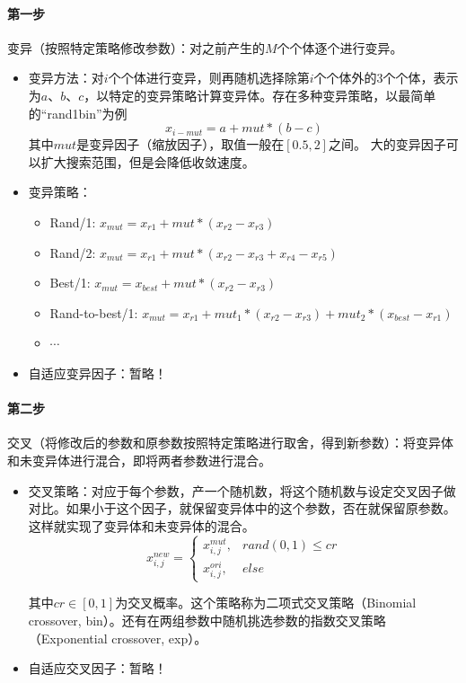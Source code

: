 \paragraph{第一步} 变异（按照特定策略修改参数）：对之前产生的$M$个个体逐个进行变异。
\begin{itemize}
\item 变异方法：对$i$个个体进行变异，则再随机选择除第$i$个个体外的3个个体，表示为$a$、$b$、$c$，以特定的变异策略计算变异体。存在多种变异策略，以最简单的“rand1bin”为例
\begin{equation}
x_{i-mut} = a + mut * (b-c)
\end{equation}
其中$mut$是变异因子（缩放因子），取值一般在$[0.5,2]$之间。 大的变异因子可以扩大搜索范围，但是会降低收敛速度。
\item 变异策略：
\begin{itemize}
\item Rand/1: $x_{mut} = x_{r1} + mut*(x_{r2}-x_{r3})$
\item Rand/2: $x_{mut} =x_{r1} + mut*(x_{r2}-x_{r3}+x_{r4}-x_{r5})$
\item Best/1: $x_{mut}=x_{best}+mut*(x_{r2}-x_{r3})$
\item Rand-to-best/1: $x_{mut}=x_{r1}+mut_1 *(x_{r2}-x_{r3}) + mut_2*(x_{best}-x_{r1})$
\item $\cdots$
\end{itemize}
\item 自适应变异因子：暂略！
\end{itemize}



\paragraph{第二步} 交叉（将修改后的参数和原参数按照特定策略进行取舍，得到新参数）：将变异体和未变异体进行混合，即将两者参数进行混合。
\begin{itemize}
\item 交叉策略：对应于每个参数，产一个随机数，将这个随机数与设定交叉因子做对比。如果小于这个因子，就保留变异体中的这个参数，否在就保留原参数。这样就实现了变异体和未变异体的混合。
\begin{equation}
x_{i,j}^{new} =\begin{cases}
x_{i,j}^{mut},& rand(0,1)\le cr\\
x_{i,j}^{ori}, &else
\end{cases}
\end{equation}

其中$cr \in [0,1]$为交叉概率。这个策略称为二项式交叉策略（Binomial crossover, bin）。还有在两组参数中随机挑选参数的指数交叉策略（Exponential crossover, exp）。

\item 自适应交叉因子：暂略！
\end{itemize}

